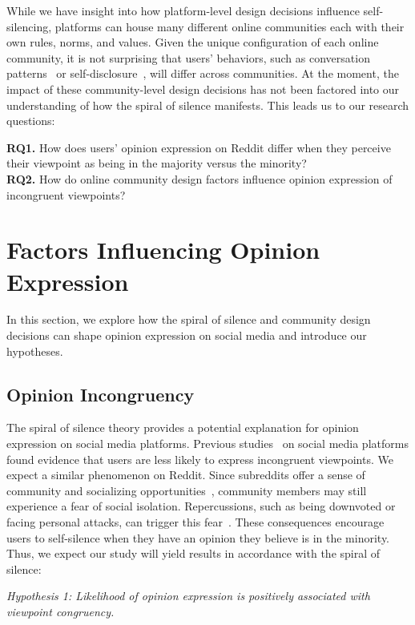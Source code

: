 While we have insight into how platform-level design decisions influence self-silencing, platforms can house many different online communities each with their own rules, norms, and values. Given the unique configuration of each online community, it is not surprising that users' behaviors, such as conversation patterns~\cite{choi2015characterizing} or self-disclosure~\cite{yang2017self}, will differ across communities. At the moment, the impact of these community-level design decisions has not been factored into our understanding of how the spiral of silence manifests. This leads us to our research questions:
\begin{addmargin}[1.25em]{0em}
\textbf{RQ1.} How does users' opinion expression on Reddit differ when they perceive their viewpoint as being in the majority versus the minority?\\
\textbf{RQ2.} How do online community design factors influence opinion expression of incongruent viewpoints?
\end{addmargin}

\section{Factors Influencing Opinion Expression}
\label{sec:factors}
In this section, we explore how the spiral of silence and community design decisions can shape opinion expression on social media and introduce our hypotheses.

\subsection{Opinion Incongruency}
The spiral of silence theory provides a potential explanation for opinion expression on social media platforms. Previous studies~\cite{pewresearchcenter_2014_sos,kushin2019societal} on social media platforms found evidence that users are less likely to express incongruent viewpoints. We expect a similar phenomenon on Reddit. Since subreddits offer a sense of community and socializing opportunities~\cite{moore2017redditors}, community members may still experience a fear of social isolation. Repercussions, such as being downvoted or facing personal attacks, can trigger this fear~\cite{neubaum2018we,cheng2017anyone}. These consequences encourage users to self-silence when they have an opinion they believe is in the minority. Thus, we expect our study will yield results in accordance with the spiral of silence: 
\begin{addmargin}[1.25em]{0em}
\textit{Hypothesis 1: Likelihood of opinion expression is positively associated with viewpoint congruency.}
\end{addmargin}

